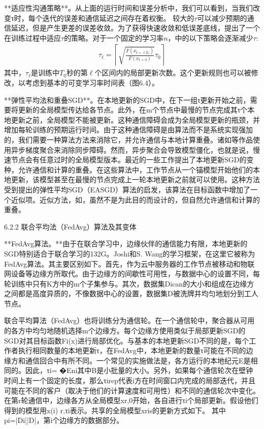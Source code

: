 **适应性沟通策略**。从上面的运行时间和误差分析中，我们可以看到，当我们改变τ时，每个迭代的误差和通信延迟之间存在着权衡。 较大的$\tau$可以减少预期的通信延迟，但是产生更差的误差收敛。为了获得快速收敛和低误差底线，提出了一个在训练过程中适应$\tau$的策略。对于一个固定的学习率$n$，中的以下策略会逐渐减少$\tau$:
\begin{align}\label{eq:6-8}
	\tau_{\ell} = \left \lceil \sqrt{\frac{F(x_{t=\ell T_{0}})}{F(x_{t=0})}}\tau_{0} \right \rceil
\end{align}
其中，$\tau_{\ell}$是训练中$T_{0}$秒的第$\ell$个区间内的局部更新次数。这个更新规则也可以被修改，以考虑到基本的可变学习率时间表（图6.4）。

**弹性平均法和重叠SGD**。在本地更新的SGD中，在下一组τ更新开始之前，需要将更新的全局模型传达给各节点。此外，在m个节点中最慢的节点完成其τ个本地更新之前，全局模型不能被更新。这种通信障碍会成为全局模型更新的瓶颈，并增加每轮训练的预期运行时间。由于这种通信障碍是由算法而不是系统实现强加的，我们需要一种算法方法来消除它，并允许通信与本地计算重叠。诸如等作品使用异步梯度聚合来消除同步障碍。然而，异步聚合会导致模型僵化，也就是说，慢速节点会有任意过时的全局模型版本。最近的一些工作提出了本地更新SGD的变种，允许通信和计算的重叠。在这些算法中，工作节点从一个锚模型开始他们的本地更新，该模型甚至在最慢的节点完成上一轮本地更新之前就可以使用。这种方法受到提出的弹性平均SGD（EASGD）算法的启发，该算法在目标函数中增加了一个近似项。近似方法，如，虽然不是为此目的而设计的，但自然允许通信和计算的重叠。

6.2.2 联合平均法（FedAvg）算法及其变体

**FedAvg算法。**由于在联合学习中，边缘伙伴的通信能力有限，本地更新的SGD特别适合于联合学习的132G。Joshi和S. Wang的学习框架，在这里它被称为FedAvg算法。其主要区别如下。首先，作为云中服务器的工作节点被移动和物联网设备等边缘方所取代。由于边缘方的间歇性可用性，与数据中心的设置不同，每轮训练中只有K方中的m个子集参与。其次，数据集Dican的大小和组成在边缘方之间都是高度异质的，不像数据中心的设置，数据集D被洗牌并均匀地划分到工人节点。

联合平均算法（FedAvg）也将训练分为通信轮。在一个通信轮中，聚合器从可用的各方中均匀地随机选择m个边缘方。每个边缘方使用类似于局部更新SGD的SGD对其目标函数Fi(x)进行局部优化。与基本的本地更新SGD不同的是，每个工作者执行相同数量的本地更新τ，在FedAvg中，本地更新的数量τ可能在不同的边缘方和通信回合中有所不同。一个常见的实施做法是，各方运行的本地纪元E是相同的。因此，τi= �Eni其中B是小批量的大小。另外，如果每个通信轮次在壁钟时间上有一个固定的长度，那么τirep代表i方在时间窗口内完成的局部迭代，并且可能在不同的客户（取决于他们的计算速度和可用性）和不同的通信轮次中变化。在第r轮通信中，边缘各方从全局模型xr,0开始，各自进行τi个局部更新。假设他们得到的模型用x(i) r,τi表示。共享的全局模型xris的更新方式如下。
其中pi=|Di||D|，第i个边缘方的数据部分。

